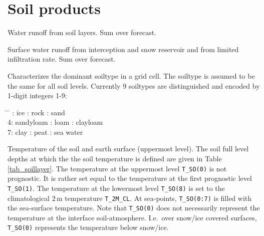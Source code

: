 \section{Soil products}
\begin{description}[leftmargin=3.0cm,style=sameline]
 \item [RUNOFF\_G] Water runoff from soil layers. Sum over forecast.

 \item [RUNOFF\_S] Surface water runoff from interception and snow reservoir and from limited infiltration rate. Sum over forecast.

 \item [SOILTYP] Characterizes the dominant soiltype in a grid cell. The soiltype is assumed to be the same for all 
                 soil levels. Currently 9 soiltypes are distinguished and encoded by 1-digit integers 1-9:
                 \begin{tabbing}
                   \hspace{0.23\textwidth} \= \hspace{0.23\textwidth} \= \hspace{0.23\textwidth} : ice  : rock : sand \\
                   4: sandyloam : loam  : clayloam \\
                   7: clay  : peat  : sea water
                 \end{tabbing}
        
 \item [T\_SO] Temperature of the soil and earth surface (uppermost level). The soil full level depths at which the 
               the soil temperature is defined are given in Table \ref{tab_soillayer}. The temperature at the uppermost 
               level \texttt{T\_SO(0)} is not prognostic. It is rather set equal to the temperature at the first prognostic 
               level \texttt{T\_SO(1)}. The temperature at the lowermost level \texttt{T\_SO(8)} is set to the climatological 
               $2\,\mathrm{m}$ temperature \texttt{T\_2M\_CL}. At sea-points, \texttt{T\_SO(0:7)} is filled with the sea-surface 
               temperature. Note that \texttt{T\_SO(0)} does not necessarily represent the temperature at the interface soil-atmosphere. 
               I.e.\ over snow/ice covered surfaces, \texttt{T\_SO(0)} represents the temperature below snow/ice.
\end{description}


